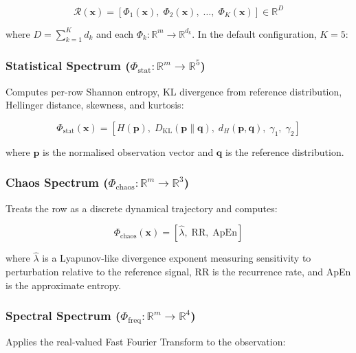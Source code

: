\documentclass[journal]{IEEEtran}
\newcommand{\R}{\mathbb{R}}
\newcommand{\calR}{\mathcal{R}}
\begin{document}
\begin{equation}
\calR(\mathbf{x}) = \left[\Phi_1(\mathbf{x}),\; \Phi_2(\mathbf{x}),\; \ldots,\; \Phi_K(\mathbf{x})\right] \in \R^D
\label{eq:stack}
\end{equation}

where $D = \sum_{k=1}^K d_k$ and each $\Phi_k: \R^m \to \R^{d_k}$. In the default configuration, $K = 5$:

\subsubsection{Statistical Spectrum ($\Phi_{\text{stat}}: \R^m \to \R^5$)}

Computes per-row Shannon entropy, KL divergence from reference distribution, Hellinger distance, skewness, and kurtosis:

\begin{equation}
\Phi_{\text{stat}}(\mathbf{x}) = \left[H(\mathbf{p}),\; D_{\text{KL}}(\mathbf{p}\|\mathbf{q}),\; d_H(\mathbf{p},\mathbf{q}),\; \gamma_1,\; \gamma_2\right]
\label{eq:phi_stat}
\end{equation}

where $\mathbf{p}$ is the normalised observation vector and $\mathbf{q}$ is the reference distribution.

\subsubsection{Chaos Spectrum ($\Phi_{\text{chaos}}: \R^m \to \R^3$)}

Treats the row as a discrete dynamical trajectory and computes:

\begin{equation}
\Phi_{\text{chaos}}(\mathbf{x}) = \left[\hat{\lambda},\; \text{RR},\; \text{ApEn}\right]
\label{eq:phi_chaos}
\end{equation}

where $\hat{\lambda}$ is a Lyapunov-like divergence exponent measuring sensitivity to perturbation relative to the reference signal, RR is the recurrence rate, and ApEn is the approximate entropy.

\subsubsection{Spectral Spectrum ($\Phi_{\text{freq}}: \R^m \to \R^4$)}

Applies the real-valued Fast Fourier Transform to the observation:
\end{document}
